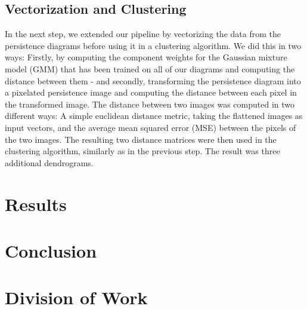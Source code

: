 \documentclass[12pt]{article}
\begin{document}
\subsection{Vectorization and Clustering}
In the next step, we extended our pipeline by vectorizing the data from the persistence diagrams before using it in a clustering algorithm. We did this in two ways: Firstly, by computing the component weights for the Gaussian mixture model (GMM) that has been trained on all of our diagrams and computing the distance between them - and secondly, transforming the persistence diagram into a pixelated persistence image and computing the distance between each pixel in the transformed image. The distance between two images was computed in two different ways: A simple euclidean distance metric, taking the flattened images as input vectors, and the average mean squared error (MSE) between the pixels of the two images. The resulting two distance matrices were then used in the clustering algorithm, similarly as in the previous step. The result was three additional dendrograms.

\section{Results}
\section{Conclusion}
\section{Division of Work}
	
	
\end{document}
